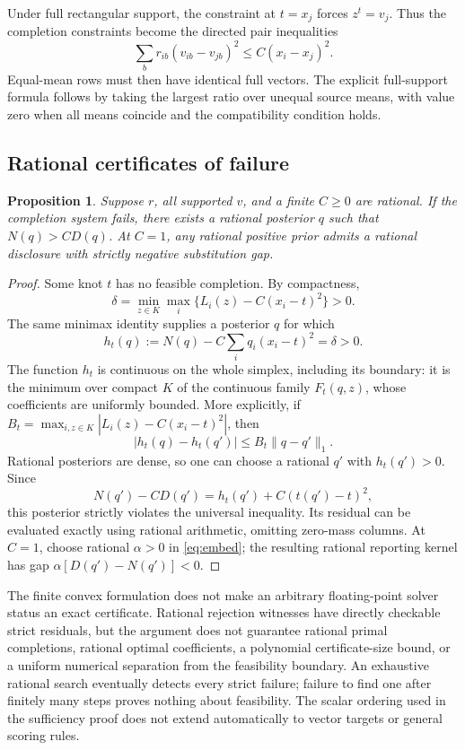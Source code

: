 \documentclass[11pt,a4paper]{article}
\newtheorem{proposition}[theorem]{Proposition}
\begin{document}
Under full rectangular support, the constraint at $t=x_j$ forces
$z^t=v_j$. Thus the completion constraints become the directed pair
inequalities
\[
 \sum_b r_{ib}(v_{ib}-v_{jb})^2\leq C(x_i-x_j)^2.
\]
Equal-mean rows must then have identical full vectors. The explicit
full-support formula follows by taking the largest ratio over unequal
source means, with value zero when all means coincide and the
compatibility condition holds.

\subsection{Rational certificates of failure}
\label{sec:rational-certificates}

\begin{proposition}\label{prop:completion-rational}
Suppose $r$, all supported $v$, and a finite $C\geq0$ are rational.
If the completion system fails, there exists a rational posterior $q$
such that $N(q)>CD(q)$. At $C=1$, any rational positive prior admits a
rational disclosure with strictly negative substitution gap.
\end{proposition}

\begin{proof}
Some knot $t$ has no feasible completion. By compactness,
\[
 \delta=\min_{z\in K}\max_i\{L_i(z)-C(x_i-t)^2\}>0.
\]
The same minimax identity supplies a posterior $q$ for which
\[
 h_t(q):=N(q)-C\sum_iq_i(x_i-t)^2=\delta>0.
\]
The function $h_t$ is continuous on the whole simplex, including its
boundary: it is the minimum over compact $K$ of the continuous family
$F_t(q,z)$, whose coefficients are uniformly bounded. More explicitly,
if $B_t=\max_{i,z\in K}|L_i(z)-C(x_i-t)^2|$, then
\[
 |h_t(q)-h_t(q')|\leq B_t\|q-q'\|_1.
\]
Rational posteriors are dense, so one can choose a rational $q'$ with
$h_t(q')>0$. Since
\[
 N(q')-CD(q')=h_t(q')+C(t(q')-t)^2,
\]
this posterior strictly violates the universal inequality. Its residual
can be evaluated exactly using rational arithmetic, omitting zero-mass
columns. At $C=1$, choose rational $\alpha>0$ in
\eqref{eq:embed}; the resulting rational reporting
kernel has gap $\alpha[D(q')-N(q')]<0$.
\end{proof}

The finite convex formulation does not make an arbitrary
floating-point solver status an exact certificate. Rational rejection
witnesses have directly checkable strict residuals, but the argument
does not guarantee rational primal completions, rational optimal
coefficients, a polynomial certificate-size bound, or a uniform
numerical separation from the feasibility boundary. An exhaustive
rational search eventually detects every strict failure; failure to
find one after finitely many steps proves nothing about feasibility.
The scalar ordering used in the sufficiency proof does not extend
automatically to vector targets or general scoring rules.
\end{document}
